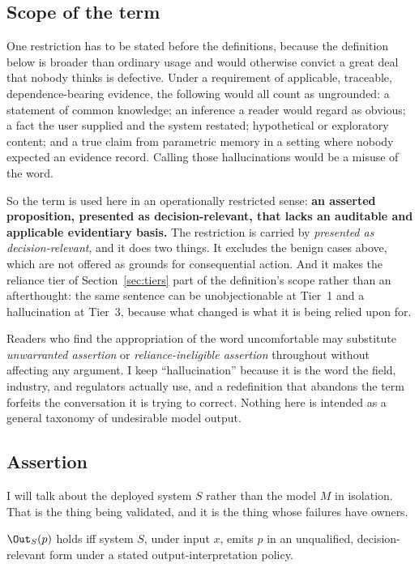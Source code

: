 \subsection{Scope of the term}
\label{sec:hall-scope}

One restriction has to be stated before the definitions, because the definition below is
broader than ordinary usage and would otherwise convict a great deal that nobody thinks
is defective. Under a requirement of applicable, traceable, dependence-bearing evidence,
the following would all count as ungrounded: a statement of common knowledge; an
inference a reader would regard as obvious; a fact the user supplied and the system
restated; hypothetical or exploratory content; and a true claim from parametric memory
in a setting where nobody expected an evidence record. Calling those hallucinations
would be a misuse of the word.

So the term is used here in an operationally restricted sense: \textbf{an asserted
proposition, presented as decision-relevant, that lacks an auditable and applicable
evidentiary basis.} The restriction is carried by \emph{presented as
decision-relevant}, and it does two things. It excludes the benign cases above, which
are not offered as grounds for consequential action. And it makes the reliance tier of
Section~\ref{sec:tiers} part of the definition's scope rather than an afterthought: the
same sentence can be unobjectionable at Tier~1 and a hallucination at Tier~3, because
what changed is what it is being relied upon for.

Readers who find the appropriation of the word uncomfortable may substitute
\emph{unwarranted assertion} or \emph{reliance-ineligible assertion} throughout without
affecting any argument. I keep ``hallucination'' because it is the word the field,
industry, and regulators actually use, and a redefinition that abandons the term
forfeits the conversation it is trying to correct. Nothing here is intended as a general
taxonomy of undesirable model output.

\subsection{Assertion}

I will talk about the deployed system $S$ rather than the model $M$ in isolation.
That is the thing being validated, and it is the thing whose failures have owners.

\begin{definition}[Assertion]
\label{def:assertion}
$\Out_S(p)$ holds iff system $S$, under input $x$, emits $p$ in an unqualified,
decision-relevant form under a stated output-interpretation policy.
\end{definition}


